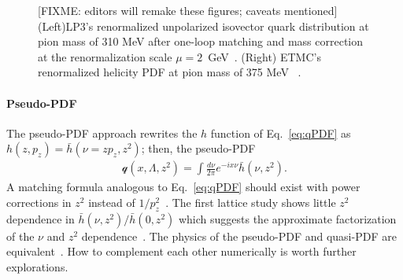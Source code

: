 \begin{figure}[t]
\caption{\small [FIXME: editors will remake these figures; caveats mentioned] 
(Left)LP3's renormalized unpolarized isovector quark distribution at pion mass of 310 MeV after one-loop matching and mass correction at the renormalization scale $\mu=2$~GeV~\cite{Chen:2017mzz}. %
(Right) ETMC's renormalized helicity PDF at pion mass of 375 MeV~\cite{Alexandrou:2017huk} . 
} \label{fig:qPDF-demo}
\end{figure}




\paragraph{Pseudo-PDF} 
The pseudo-PDF approach rewrites the $h$ function of Eq.~\ref{eq:qPDF} as $h(z,p_z)=\bar{h}(\nu=z p_z,z^2)$; then, the pseudo-PDF~\cite{Radyushkin:2016hsy,Radyushkin:2017cyf}
%
\begin{align}
\mathcal{q}(x,\Lambda,z^2)  = \int \frac{d \nu}{2\pi} e^{-i x \nu}  \bar{h}(\nu,z^2). 
\end{align}
% 
A matching formula analogous to Eq.~\ref{eq:qPDF} should exist with power corrections in $z^2$ instead of $1/p_z^2$~\cite{Ji:2017rah}. The first lattice study shows little $z^2$ dependence in $\bar{h}(\nu,z^2)/\bar{h}(0,z^2)$ which suggests the approximate factorization of the $\nu$ and $z^2$ dependence~\cite{Orginos:2017kos}. The physics of the pseudo-PDF and quasi-PDF are equivalent~\cite{Ji:2017rah}. How to complement each other numerically is worth further explorations.
